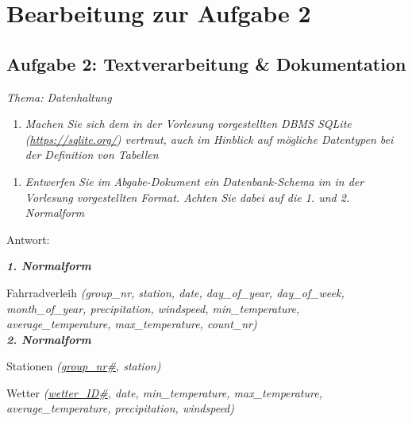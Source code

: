 \documentclass{article}
\begin{document}
 \newpage

\section{Bearbeitung zur Aufgabe 2}  
\subsection{{Aufgabe 2: Textverarbeitung \& Dokumentation}} \hypertarget{Aufgabe 2}{} 
 \textit{Thema: Datenhaltung} 

\begin{enumerate} 
    \item \textit{Machen Sie sich dem in der Vorlesung vorgestellten DBMS SQLite (\url{https://sqlite.org/}) vertraut, auch im Hinblick auf mögliche Datentypen bei der Definition von Tabellen}
    \end{enumerate}

\begin{enumerate}[resume]
    \item \textit{Entwerfen Sie im Abgabe-Dokument ein Datenbank-Schema im in der Vorlesung vorgestellten Format. Achten Sie dabei auf die 1. und 2. Normalform}
    \end{enumerate}

Antwort: 

\textbf{\textit{1. Normalform}} 

Fahrradverleih \hspace{0,2cm} \textit{(group\_nr, station, date, day\_of\_year, day\_of\_week, month\_of\_year, \hspace*{3cm}
 precipitation, windspeed,   min\_temperature, average\_temperature, \hspace*{3cm} max\_temperature, count\_nr)} \\

 

\textbf{\textit{2. Normalform}}  \indent

Stationen \hspace{1cm}\textit{(\underline {group\_nr\#}, station)} \\ \indent

Wetter \hspace{1.5cm}\textit{(\underline {wetter\_ID\#}, date, min\_temperature, max\_temperature, \\ \indent
\hspace{2.75cm }average\_temperature, precipitation, windspeed)} \\
\end{document}
